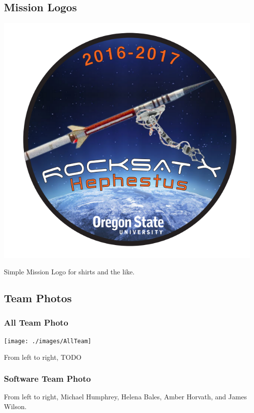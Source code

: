 \subsection{Mission Logos}
\includegraphics[width=\textwidth]{./images/logo}
\begin{center}
Simple Mission Logo for shirts and the like.
\end{center}

\subsection{Team Photos}
\subsubsection{All Team Photo}
\texttt{[image: ./images/AllTeam]}
\begin{center}
From left to right, TODO
\end{center}

\subsubsection{Software Team Photo}
\begin{center}
From left to right, Michael Humphrey, Helena Bales, Amber Horvath, and James Wilson.
\end{center}

